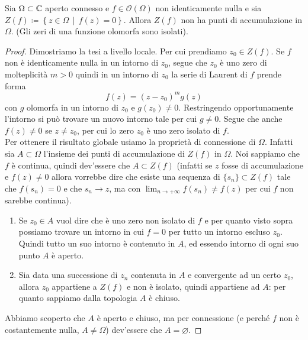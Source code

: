 \begin{theorem}
   \label{thr:zeri_di_funz_no_accum}
  Sia $\Omega \subset \mathbb{C}$ aperto connesso e $f\in \mathcal{O}(\Omega)$ non
  identicamente nulla e sia $Z(f) \coloneqq \left\{ z \in \Omega \,\middle|\,
  f(z) = 0 \right\}$. Allora  $Z(f)$ non ha punti di accumulazione in $\Omega$.
  (Gli zeri di una funzione olomorfa sono isolati).
\end{theorem}
\begin{proof}
    Dimostriamo la tesi a livello locale. Per cui prendiamo $z_0 \in Z(f)$. Se
    $f$ non è identicamente nulla in un intorno di $z_0$, segue che $z_0$ è uno
    zero di molteplicità $m > 0$ quindi in un intorno di $z_0$ la serie di
    Laurent di $f$ prende forma
    \begin{equation*}
      f(z) = (z-z_0)^m g(z)
    \end{equation*}
    con $g$ olomorfa in un intorno di $z_0$ e $g(z_0) \neq 0$.
    Restringendo opportunamente l'intorno si può trovare un nuovo intorno tale
    per cui $g \neq 0$. Segue che anche $f(z) \neq 0$ se $z \neq z_0$, per cui
    lo zero $z_0$ è uno zero isolato di $f$.\\

    Per ottenere il risultato globale usiamo la proprietà di connessione di
    $\Omega$. Infatti sia $A \subset \Omega$ l'insieme dei punti di
    accumulazione di $Z(f)$ in $\Omega$. Noi sappiamo che $f$ è continua, quindi
    dev'essere che $A \subset Z(f)$ (infatti se $z$ fosse di accumulazione
      e $f(z) \neq 0$ allora vorrebbe dire che esiste una sequenza di $\{s_n\}
    \subset Z(f)$ tale che $f(s_n) = 0$ e che $s_n \to z$, ma con 
    $\lim_{n\to+\infty} f(s_n) \neq f(z)$ per cui $f$ non sarebbe continua).
    \begin{enumerate}
    	\item Se $z_0 \in A$ vuol dire che è uno zero non isolato
    	di $f$ e per quanto visto sopra possiamo trovare un intorno in cui $f =
    	0$ per tutto un intorno escluso $z_0$. Quindi tutto un suo intorno è contenuto in $A$, ed essendo intorno di ogni suo punto $A$ è aperto.
    	\item Sia data una successione di $z_n$ contenuta in $A$ e convergente ad un certo $z_0$, allora $z_0$ appartiene a $Z(f)$ e non è isolato, quindi appartiene ad $A$: per quanto sappiamo dalla topologia $A$ è chiuso.
    \end{enumerate}
  Abbiamo scoperto che $A$ è aperto e chiuso, ma per connessione (e perché $f$ non è costantemente nulla, $A \neq \Omega$) dev'essere che $A = \varnothing$.
\end{proof}

